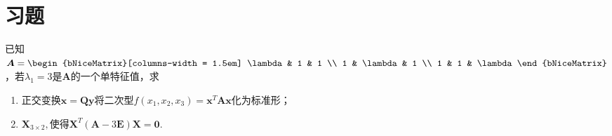 \documentclass[12pt, a4paper, oneside, UTF8]{ctexbook}
\begin{document}
\section{习题}
\begin{exercise}
  已知$\bm{A}=\begin{bNiceMatrix}[columns-width = 1.5em]
    \lambda & 1 & 1 \\
    1 & \lambda & 1 \\
    1 & 1 & \lambda
    \end{bNiceMatrix}$，若$\lambda_1=3$是$\bm{A}$的一个单特征值，求\begin{enumerate}[label = (\arabic*)]
        \item 正交变换$\bm{x}=\bm{Q}\bm{y}$将二次型$f(x_1,x_2,x_3)=\bm{x}^T\bm{A}\bm{x}$化为标准形；
        \item $\bm{X}_{3 \times 2},$使得$\bm{X}^T(\bm{A}-3\bm{E})\bm{X}=\bm{0}$.
    \end{enumerate}
\end{exercise}
\end{document}
